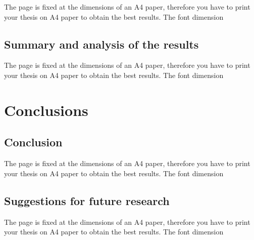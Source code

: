 \documentclass[LaM,binding=0.6cm, english]{sapthesis}
\begin{document}
The page is fixed at the dimensions of an A4 paper, therefore you have to print your thesis on A4 paper to obtain the best results. The font dimension

\section{Summary and analysis of the results}

The page is fixed at the dimensions of an A4 paper, therefore you have to print your thesis on A4 paper to obtain the best results. The font dimension

\chapter{Conclusions}

\section{Conclusion}

The page is fixed at the dimensions of an A4 paper, therefore you have to print your thesis on A4 paper to obtain the best results. The font dimension

\section{Suggestions for future research}

The page is fixed at the dimensions of an A4 paper, therefore you have to print your thesis on A4 paper to obtain the best results. The font dimension

\backmatter
\end{document}
